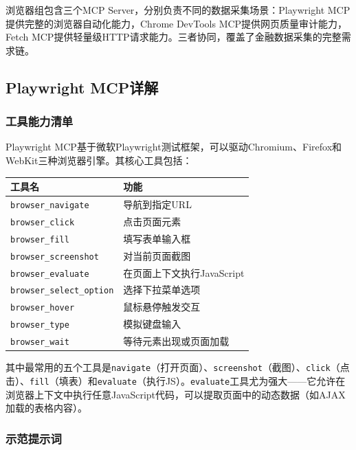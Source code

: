 浏览器组包含三个MCP Server，分别负责不同的数据采集场景：Playwright MCP提供完整的浏览器自动化能力，Chrome DevTools MCP提供网页质量审计能力，Fetch MCP提供轻量级HTTP请求能力。三者协同，覆盖了金融数据采集的完整需求链。

\subsection{Playwright MCP详解}

\subsubsection{工具能力清单}

Playwright MCP基于微软Playwright测试框架，可以驱动Chromium、Firefox和WebKit三种浏览器引擎。其核心工具包括：

\begin{table}[H]
\centering
\begin{tabular}{lp{9cm}}
\toprule
\textbf{工具名} & \textbf{功能} \\
\midrule
\texttt{browser\_navigate} & 导航到指定URL \\
\texttt{browser\_click} & 点击页面元素 \\
\texttt{browser\_fill} & 填写表单输入框 \\
\texttt{browser\_screenshot} & 对当前页面截图 \\
\texttt{browser\_evaluate} & 在页面上下文执行JavaScript \\
\texttt{browser\_select\_option} & 选择下拉菜单选项 \\
\texttt{browser\_hover} & 鼠标悬停触发交互 \\
\texttt{browser\_type} & 模拟键盘输入 \\
\texttt{browser\_wait} & 等待元素出现或页面加载 \\
\bottomrule
\end{tabular}
\end{table}

其中最常用的五个工具是\texttt{navigate}（打开页面）、\texttt{screenshot}（截图）、\texttt{click}（点击）、\texttt{fill}（填表）和\texttt{evaluate}（执行JS）。\texttt{evaluate}工具尤为强大——它允许在浏览器上下文中执行任意JavaScript代码，可以提取页面中的动态数据（如AJAX加载的表格内容）。

\subsubsection{示范提示词}

